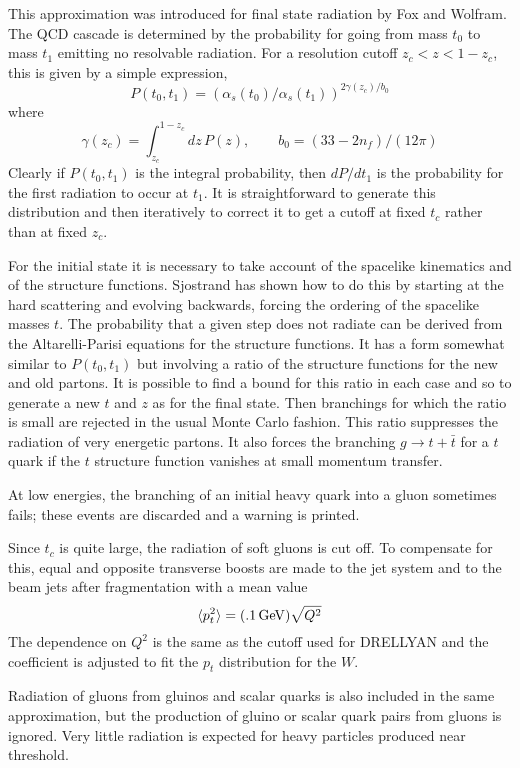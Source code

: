       This approximation was introduced for final state radiation by
Fox and Wolfram. The QCD cascade is determined by the probability for
going from mass $t_0$ to mass $t_1$ emitting no resolvable radiation.
For a resolution cutoff $z_c < z < 1-z_c$, this is given by a simple
expression,
$$      
P(t_0,t_1)=\left(\alpha_s(t_0)/\alpha_s(t_1)\right)^{2\gamma(z_c)/b_0}
$$
where
$$
\gamma(z_c)=\int_{z_c}^{1-z_c} dz\,P(z),\qquad
b_0=(33-2n_f)/(12\pi)
$$
Clearly if $P(t_0,t_1)$ is the integral probability, then $dP/dt_1$ is
the probability for the first radiation to occur at $t_1$. It is
straightforward to generate this distribution and then iteratively to
correct it to get a cutoff at fixed $t_c$ rather than at fixed $z_c$.

      For the initial state it is necessary to take account of the
spacelike kinematics and of the structure functions. Sjostrand has
shown how to do this by starting at the hard scattering and evolving
backwards, forcing the ordering of the spacelike masses $t$. The
probability that a given step does not radiate can be derived from the
Altarelli-Parisi equations for the structure functions. It has a form
somewhat similar to $P(t_0,t_1)$ but involving a ratio of the structure
functions for the new and old partons. It is possible to find a bound
for this ratio in each case and so to generate a new $t$ and $z$ as for
the final state. Then branchings for which the ratio is small are
rejected in the usual Monte Carlo fashion. This ratio suppresses the
radiation of very energetic partons. It also forces the branching $g
\to t + \bar t$ for a $t$ quark if the $t$ structure function vanishes
at small momentum transfer.

      At low energies, the branching of an initial heavy quark into a
gluon sometimes fails; these events are discarded and a warning is
printed.

      Since $t_c$ is quite large, the radiation of soft gluons is cut
off. To compensate for this, equal and opposite transverse boosts are
made to the jet system and to the beam jets after fragmentation with a
mean value
$$
\langle p_t^2\rangle = (.1\,{\rm GeV}) \sqrt{Q^2}
$$
The dependence on $Q^2$ is the same as the cutoff used for DRELLYAN and
the coefficient is adjusted to fit the $p_t$ distribution for the $W$.

      Radiation of gluons from gluinos and scalar quarks is also
included in the same approximation, but the production of gluino or
scalar quark pairs from gluons is ignored. Very little radiation is
expected for heavy particles produced near threshold.

